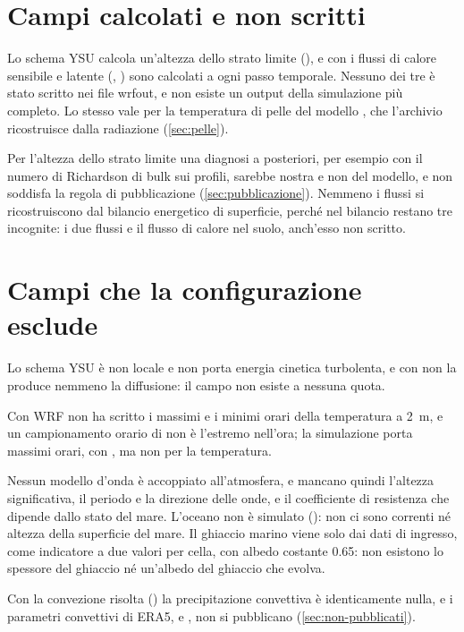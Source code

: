 \section{Campi calcolati e non scritti}
\label{sec:non-scritti}

Lo schema YSU calcola un'altezza dello strato limite (), e con  i flussi
di calore sensibile e latente (, ) sono calcolati a ogni passo temporale. Nessuno
dei tre è stato scritto nei file wrfout, e non esiste un output della simulazione più completo. Lo
stesso vale per la temperatura di pelle del modello , che l'archivio ricostruisce dalla
radiazione (\cref{sec:pelle}).

Per l'altezza dello strato limite una diagnosi a posteriori, per esempio con il numero di Richardson
di bulk sui profili, sarebbe nostra e non del modello, e non soddisfa la regola di pubblicazione
(\cref{sec:pubblicazione}). Nemmeno i flussi si ricostruiscono dal bilancio energetico di superficie,
perché nel bilancio restano tre incognite: i due flussi e il flusso di calore nel suolo, anch'esso non
scritto.

\section{Campi che la configurazione esclude}
\label{sec:configurazione-limiti}

Lo schema YSU è non locale e non porta energia cinetica turbolenta, e con  non la
produce nemmeno la diffusione: il campo non esiste a nessuna quota.

Con  WRF non ha scritto i massimi e i minimi orari della temperatura a
\SI{2}{m}, e un campionamento orario di  non è l'estremo nell'ora; la simulazione porta
massimi orari, con , ma non per la temperatura.

Nessun modello d'onda è accoppiato all'atmosfera, e mancano quindi l'altezza significativa, il
periodo e la direzione delle onde, e il coefficiente di resistenza che dipende dallo stato del mare.
L'oceano non è simulato (): non ci sono correnti né altezza della superficie
del mare. Il ghiaccio marino viene solo dai dati di ingresso, come indicatore a due valori per cella,
con albedo costante \num{0.65}: non esistono lo spessore del ghiaccio né un'albedo del ghiaccio che
evolva.

Con la convezione risolta () la precipitazione convettiva  è
identicamente nulla, e i parametri convettivi di ERA5,  e , non si pubblicano
(\cref{sec:non-pubblicati}).

